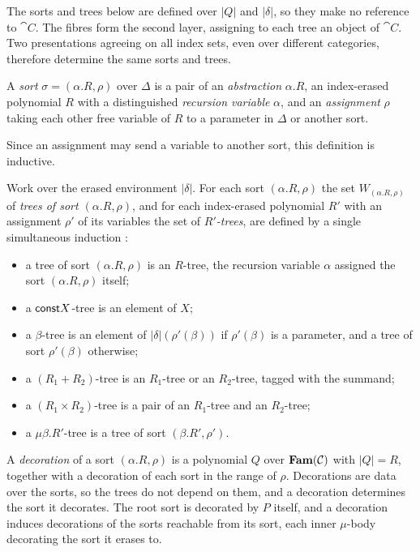 The sorts and trees below are defined over $|Q|$ and $|\delta|$, so they make no reference to
$\cat{C}$. The fibres form the second layer, assigning to each tree an object of $\cat{C}$. Two
presentations agreeing on all index sets, even over different categories, therefore determine the
same sorts and trees.

\begin{definition}[Sort]
\label{def:polynomial-types:sort}
A \emph{sort} $\sigma = (\alpha.R, \rho)$ over $\Delta$ is a pair of an \emph{abstraction}
$\alpha.R$, an index-erased polynomial $R$ with a distinguished \emph{recursion variable} $\alpha$,
and an \emph{assignment} $\rho$ taking each other free variable of $R$ to a parameter in $\Delta$ or
another sort.
\end{definition}

Since an assignment may send a variable to another sort, this definition is inductive.

\begin{definition}
\label{def:polynomial-types:trees}
Work over the erased environment $|\delta|$. For each sort $(\alpha.R, \rho)$ the set
$W_{(\alpha.R,\rho)}$ of \emph{trees of sort $(\alpha.R, \rho)$}, and for each index-erased
polynomial $R'$ with an assignment $\rho'$ of its variables the set of \emph{$R'$-trees}, are
defined by a single simultaneous induction \citep{abbott2004}:
\begin{itemize}
\item a tree of sort $(\alpha.R, \rho)$ is an $R$-tree, the recursion variable $\alpha$ assigned the
  sort $(\alpha.R, \rho)$ itself;
\item a $\mathsf{const} X$-tree is an element of $X$;
\item a $\beta$-tree is an element of $|\delta|(\rho'(\beta))$ if $\rho'(\beta)$ is a parameter, and a
  tree of sort $\rho'(\beta)$ otherwise;
\item a $(R_1 + R_2)$-tree is an $R_1$-tree or an $R_2$-tree, tagged with the summand;
\item a $(R_1 \times R_2)$-tree is a pair of an $R_1$-tree and an $R_2$-tree;
\item a $\mu\beta.R'$-tree is a tree of sort $(\beta.R', \rho')$.
\end{itemize}
\end{definition}

\begin{definition}[Decoration]
\label{def:polynomial-types:decoration}
A \emph{decoration} of a sort $(\alpha.R, \rho)$ is a polynomial $Q$ over $\mathbf{Fam}(\mathcal{C})$ with $|Q| =
R$, together with a decoration of each sort in the range of $\rho$. Decorations are data over the
sorts, so the trees do not depend on them, and a decoration determines the sort it decorates. The
root sort is decorated by $P$ itself, and a decoration induces decorations of the sorts reachable
from its sort, each inner $\mu$-body decorating the sort it erases to.
\end{definition}

